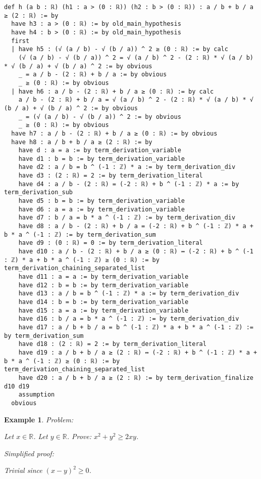 \documentclass{article}
\newtheorem{example}{Example}
\begin{document}
\begin{tcolorbox}[colback=white!10, width=\linewidth]
\begin{lstlisting}[language=Lean4]
def h (a b : ℝ) (h1 : a > (0 : ℝ)) (h2 : b > (0 : ℝ)) : a / b + b / a ≥ (2 : ℝ) := by
  have h3 : a > (0 : ℝ) := by old_main_hypothesis
  have h4 : b > (0 : ℝ) := by old_main_hypothesis
  first
  | have h5 : (√ (a / b) - √ (b / a)) ^ 2 ≥ (0 : ℝ) := by calc
    (√ (a / b) - √ (b / a)) ^ 2 = √ (a / b) ^ 2 - (2 : ℝ) * √ (a / b) * √ (b / a) + √ (b / a) ^ 2 := by obvious
    _ = a / b - (2 : ℝ) + b / a := by obvious
    _ ≥ (0 : ℝ) := by obvious
  | have h6 : a / b - (2 : ℝ) + b / a ≥ (0 : ℝ) := by calc
    a / b - (2 : ℝ) + b / a = √ (a / b) ^ 2 - (2 : ℝ) * √ (a / b) * √ (b / a) + √ (b / a) ^ 2 := by obvious
    _ = (√ (a / b) - √ (b / a)) ^ 2 := by obvious
    _ ≥ (0 : ℝ) := by obvious
  have h7 : a / b - (2 : ℝ) + b / a ≥ (0 : ℝ) := by obvious
  have h8 : a / b + b / a ≥ (2 : ℝ) := by
    have d : a = a := by term_derivation_variable
    have d1 : b = b := by term_derivation_variable
    have d2 : a / b = b ^ (-1 : ℤ) * a := by term_derivation_div
    have d3 : (2 : ℝ) = 2 := by term_derivation_literal
    have d4 : a / b - (2 : ℝ) = (-2 : ℝ) + b ^ (-1 : ℤ) * a := by term_derivation_sub
    have d5 : b = b := by term_derivation_variable
    have d6 : a = a := by term_derivation_variable
    have d7 : b / a = b * a ^ (-1 : ℤ) := by term_derivation_div
    have d8 : a / b - (2 : ℝ) + b / a = (-2 : ℝ) + b ^ (-1 : ℤ) * a + b * a ^ (-1 : ℤ) := by term_derivation_sum
    have d9 : (0 : ℝ) = 0 := by term_derivation_literal
    have d10 : a / b - (2 : ℝ) + b / a ≥ (0 : ℝ) ↔ (-2 : ℝ) + b ^ (-1 : ℤ) * a + b * a ^ (-1 : ℤ) ≥ (0 : ℝ) := by term_derivation_chaining_separated_list
    have d11 : a = a := by term_derivation_variable
    have d12 : b = b := by term_derivation_variable
    have d13 : a / b = b ^ (-1 : ℤ) * a := by term_derivation_div
    have d14 : b = b := by term_derivation_variable
    have d15 : a = a := by term_derivation_variable
    have d16 : b / a = b * a ^ (-1 : ℤ) := by term_derivation_div
    have d17 : a / b + b / a = b ^ (-1 : ℤ) * a + b * a ^ (-1 : ℤ) := by term_derivation_sum
    have d18 : (2 : ℝ) = 2 := by term_derivation_literal
    have d19 : a / b + b / a ≥ (2 : ℝ) ↔ (-2 : ℝ) + b ^ (-1 : ℤ) * a + b * a ^ (-1 : ℤ) ≥ (0 : ℝ) := by term_derivation_chaining_separated_list
    have d20 : a / b + b / a ≥ (2 : ℝ) := by term_derivation_finalize d10 d19
    assumption
  obvious

\end{lstlisting}
\end{tcolorbox}


\begin{example}
Problem:
\begin{tcolorbox}[colback=yellow!10, width=\linewidth]
Let $x\in\mathbb{R}$. Let $y\in\mathbb{R}$.
    Prove: $x^2 + y^2 \ge 2xy$.
\end{tcolorbox}

Simplified proof:
\begin{tcolorbox}[colback=blue!10, width=\linewidth]
Trivial since $(x-y)^2 \ge 0$.
\end{tcolorbox}
\end{example}
\end{document}
